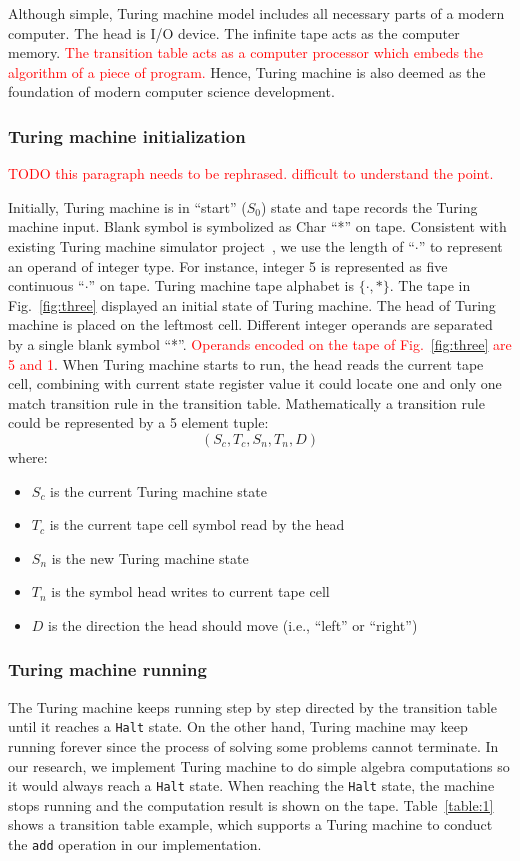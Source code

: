 \documentclass[lnicst]{svmultln}
\newcommand{\F}{Fig.}
\begin{document}
Although simple, Turing machine model includes all necessary parts of a modern
computer. The head is I/O device. The infinite tape acts as the computer memory.
\textcolor{red}{The transition table acts as a computer processor which embeds
  the algorithm of a piece of program.} Hence, Turing machine is also deemed as
the foundation of modern computer science development.


\subsubsection{Turing machine initialization}
\textcolor{red}{TODO this paragraph needs to be rephrased. difficult to understand the point.}

Initially, Turing machine is in ``start'' (\(S_0\)) state and tape records the
Turing machine input. Blank symbol is symbolized as Char ``*'' on tape.
Consistent with existing Turing machine simulator project~\cite{SingleTape}, we
use the length of ``$\cdot$'' to represent an operand of integer type. For
instance, integer 5 is represented as five continuous ``$\cdot$'' on tape.
Turing machine tape alphabet is $\{\cdot,* \}$. The tape in \F~\ref{fig:three}
displayed an initial state of Turing machine. The head of Turing machine is
placed on the leftmost cell. Different integer operands are separated by a
single blank symbol ``*''. \textcolor{red}{Operands encoded on the tape of
  \F~\ref{fig:three} are 5 and 1}. When Turing machine starts to run, the head
reads the current tape cell, combining with current state register value it
could locate one and only one match transition rule in the transition table.
Mathematically a transition rule could be represented by a 5 element
tuple:\[(S_c, T_c, S_n, T_n, D)\] where:

\begin{itemize}
  \item \(S_c\) is the current Turing machine state
  \item \(T_c\) is the current tape cell symbol read by the head
  \item \(S_n\) is the new Turing machine state
  \item \(T_n\) is the symbol head writes to current tape cell
  \item \(D\) is the direction the head should move (i.e., ``left'' or
    ``right'')
\end{itemize}

\subsubsection{Turing machine running}
The Turing machine keeps running step by step directed by the transition table
until it reaches a \texttt{Halt} state. On the other hand, Turing machine may
keep running forever since the process of solving some problems cannot
terminate. In our research, we implement Turing machine to do simple algebra
computations so it would always reach a \texttt{Halt} state. When reaching the
\texttt{Halt} state, the machine stops running and the computation result is
shown on the tape. Table~\ref{table:1} shows a transition table example, which
supports a Turing machine to conduct the \texttt{add} operation in our
implementation.
\end{document}
